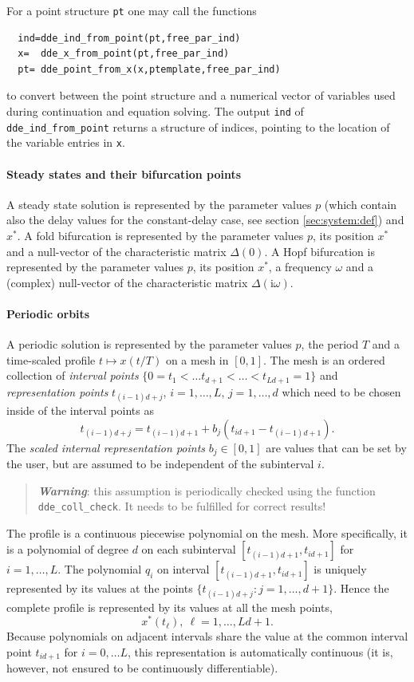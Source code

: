 \documentclass[10pt]{scrartcl}
\newcommand{\define}[1]{\emph{#1}}
\renewcommand{\i}{\mathrm{i}}
\newcommand{\blist}[1]{\mbox{\lstinline!#1!}}
\begin{document}
For a point structure \blist{pt} one may call the functions
\begin{lstlisting}
  ind=dde_ind_from_point(pt,free_par_ind)
  x=  dde_x_from_point(pt,free_par_ind)
  pt= dde_point_from_x(x,ptemplate,free_par_ind)
\end{lstlisting}
to convert between the point structure and a numerical vector of
variables used during continuation and equation solving. The output
\blist{ind} of \blist{dde_ind_from_point} returns a structure of
indices, pointing to the location of the variable entries in \blist{x}.
\paragraph{Steady states and their bifurcation points}
A steady state solution is represented by the parameter values
$p$ (which contain also the delay values for the constant-delay case, 
see section \ref{sec:system:def})
and $x^*$. A fold bifurcation is represented by the parameter
values $p$, its position $x^*$ and a null-vector of the
characteristic matrix $\Delta(0)$. A Hopf bifurcation is represented 
by the parameter
values $p$, its position $x^*$, a frequency $\omega$
and a (complex) null-vector of the
characteristic matrix $\Delta(\i \omega)$.

\paragraph{Periodic orbits}
A periodic solution is represented by the parameter
values $p$, the period $T$ and 
a time-scaled profile $t\mapsto x(t/T)$ on a mesh in $[0,1]$.
The mesh is an ordered 
collection of \define{interval points} $\{0=t_1<\ldots t_{d+1}<\ldots<t_{Ld+1}=1\}$
and \define{representation points} $t_{(i-1)d+j}$, $i=1,\ldots,L$,
$j=1,\ldots,d$ which need to be chosen inside of the interval points as
\[
t_{(i-1)d+j}=t_{(i-1)d+1}+b_j(t_{id+1}-t_{(i-1)d+1})\mbox{.}
\]
The \define{scaled internal representation points} $b_j\in[0,1]$ are values that can be set by the user, but
are assumed to be independent of the subinterval $i$.
\begin{quote}
  \textbf{\emph{Warning}}: this assumption is periodically checked
  using the function \blist{dde_coll_check}. It needs to be fulfilled
  for correct results!
\end{quote}
The profile is a continuous piecewise polynomial on the mesh. 
More specifically, it is
a polynomial of degree $d$ on each
subinterval $[t_{(i-1)d+1},t_{id+1}]$ for $i=1,\ldots,L$.
The polynomial $q_i$ on interval $[t_{(i-1)d+1},t_{id+1}]$ is uniquely represented
by its values at the points $\{t_{(i-1)d+j}: j=1,\ldots,d+1\}$.
Hence the complete profile is represented by
its values at all the mesh points,
\[
x^*\left(t_\ell\right),\ \ell=1,\ldots,Ld+1\mbox{.}
\]
Because polynomials on adjacent intervals share the value at the
common interval point $t_{id+1}$ for $i=0,\ldots L$, this
representation is automatically continuous (it is, however, not
ensured to be continuously differentiable).
\end{document}
